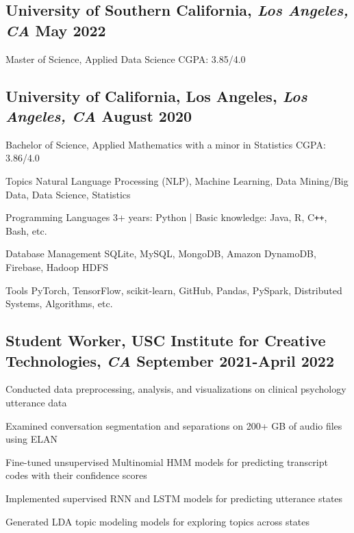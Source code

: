 \documentclass[11pt]{article}
\begin{document}
\subsection*{University of Southern California{\normalfont, \textit{Los Angeles, CA} \hfill May 2022}}
\noindent
Master of Science, Applied Data Science
\hfill
CGPA: 3.85/4.0


\subsection*{University of California, Los Angeles{\normalfont, \textit{Los Angeles, CA} \hfill August 2020}}
\noindent
Bachelor of Science, Applied Mathematics with a minor in Statistics
\hfill
CGPA: 3.86/4.0

\vspace{0.1in}

\vspace{0.05in}
\begin{compactdesc}
	\item[Topics] Natural Language Processing (NLP), Machine Learning, Data Mining/Big Data, Data Science, Statistics
    \item[Programming Languages] 3+ years: Python | Basic knowledge: Java, R, C\texttt{++}, Bash, etc.
    \item[Database Management] SQLite, MySQL, MongoDB, Amazon DynamoDB, Firebase, Hadoop HDFS
    \item[Tools] PyTorch, TensorFlow, scikit-learn, GitHub, Pandas, PySpark, Distributed Systems, Algorithms, etc.
\end{compactdesc}

\vspace{0.1in}

\subsection*{Student Worker{\normalfont, USC Institute for Creative
            Technologies,
            \textit{CA} \hfill
            September 2021-April 2022}}
\begin{compactitem}
    \item Conducted data preprocessing, analysis, and visualizations on clinical psychology utterance data
    \item Examined conversation segmentation and separations on 200+ GB of audio files using ELAN
    \item Fine-tuned unsupervised Multinomial HMM models for predicting transcript codes with their confidence scores
    \item Implemented supervised RNN and LSTM models for predicting utterance states
    \item Generated LDA topic modeling models for exploring topics across states
\end{compactitem}
\end{document}
